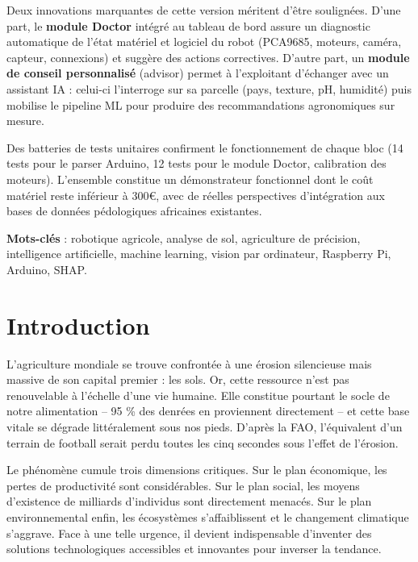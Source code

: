 \documentclass[a4paper,12pt,openany,titlepage]{scrartcl}
\begin{document}
Deux innovations marquantes de cette version méritent d’être soulignées. D’une part, le \textbf{module Doctor} intégré au tableau de bord assure un diagnostic automatique de l’état matériel et logiciel du robot (PCA9685, moteurs, caméra, capteur, connexions) et suggère des actions correctives. D’autre part, un \textbf{module de conseil personnalisé} (advisor) permet à l’exploitant d’échanger avec un assistant IA : celui-ci l’interroge sur sa parcelle (pays, texture, pH, humidité) puis mobilise le pipeline ML pour produire des recommandations agronomiques sur mesure.

Des batteries de tests unitaires confirment le fonctionnement de chaque bloc (14 tests pour le parser Arduino, 12 tests pour le module Doctor, calibration des moteurs). L’ensemble constitue un démonstrateur fonctionnel dont le coût matériel reste inférieur à 300\euro, avec de réelles perspectives d’intégration aux bases de données pédologiques africaines existantes.

\textbf{Mots-cl\'es} : robotique agricole, analyse de sol, agriculture de pr\'ecision, intelligence artificielle, machine learning, vision par ordinateur, Raspberry Pi, Arduino, SHAP.

\newpage

\section{Introduction}

L’agriculture mondiale se trouve confrontée à une érosion silencieuse mais massive de son capital premier : les sols. Or, cette ressource n’est pas renouvelable à l’échelle d’une vie humaine. Elle constitue pourtant le socle de notre alimentation – 95 \% des denrées en proviennent directement – et cette base vitale se dégrade littéralement sous nos pieds. D’après la FAO, l’équivalent d’un terrain de football serait perdu toutes les cinq secondes sous l’effet de l’érosion.

Le phénomène cumule trois dimensions critiques. Sur le plan économique, les pertes de productivité sont considérables. Sur le plan social, les moyens d’existence de milliards d’individus sont directement menacés. Sur le plan environnemental enfin, les écosystèmes s’affaiblissent et le changement climatique s’aggrave. Face à une telle urgence, il devient indispensable d’inventer des solutions technologiques accessibles et innovantes pour inverser la tendance.
\end{document}
